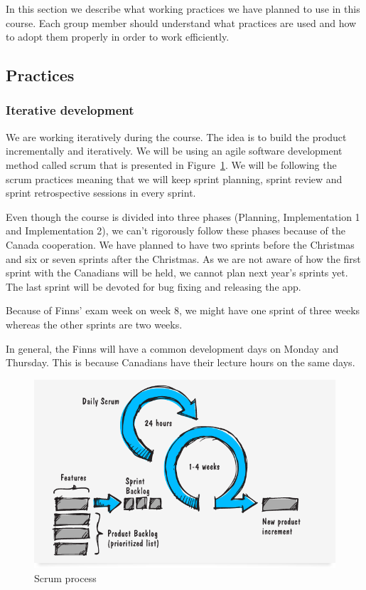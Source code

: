 In this section we describe what working practices we have planned to use in
this course. Each group member should understand what practices are used and
how to adopt them properly in order to work efficiently.

\subsection{Practices}

\subsubsection{Iterative development}

We are working iteratively during the course. The idea is to build the product
incrementally and iteratively. We will be using an agile software development
method called scrum that is presented in Figure~\ref{fig:scrum}. We will be
following the scrum practices meaning that we will keep sprint planning, sprint
review and sprint retrospective sessions in every sprint.

Even though the course is divided into three phases (Planning, Implementation 1
and Implementation 2), we can't rigorously follow these phases because of the
Canada cooperation. We have planned to have two sprints before the Christmas and
six or seven sprints after the Christmas. As we are not aware of how the first
sprint with the Canadians will be held, we cannot plan next year's sprints yet.
The last sprint will be devoted for bug fixing and releasing the app.

Because of Finns' exam week on week 8, we might have one sprint of three weeks
whereas the other sprints are two weeks. 

In general, the Finns will have a common development days on Monday and
Thursday. This is because Canadians have their lecture hours on the same days.

\begin{figure}[H]
\centering
\includegraphics[width=1\textwidth]{imgs/scrum_process_en.png}
\caption{Scrum process}
\label{fig:scrum}
\end{figure}

